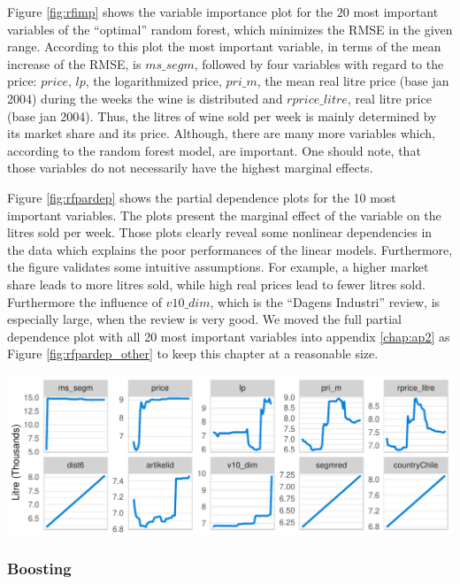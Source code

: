 \documentclass[11pt,]{article}
\let\origfigure\figure
\let\endorigfigure\endfigure
\renewenvironment{figure}[1][2] {
    \expandafter\origfigure\expandafter[H]
} {
    \endorigfigure
}
\begin{document}
Figure \ref{fig:rfimp} shows the variable importance plot for the \(20\)
most important variables of the \enquote{optimal} random forest, which
minimizes the \ac{RMSE} in the given range. According to this plot the
most important variable, in terms of the mean increase of the \ac{RMSE},
is \(ms\_segm\), followed by four variables with regard to the price:
\(price\), \(lp\), the logarithmized price, \(pri\_m\), the mean real
litre price (base jan 2004) during the weeks the wine is distributed and
\(rprice\_litre\), real litre price (base jan 2004). Thus, the litres of
wine sold per week is mainly determined by its market share and its
price. Although, there are many more variables which, according to the
random forest model, are important. One should note, that those
variables do not necessarily have the highest marginal effects.

Figure \ref{fig:rfpardep} shows the partial dependence plots for the 10
most important variables. The plots present the marginal effect of the
variable on the litres sold per week. Those plots clearly reveal some
nonlinear dependencies in the data which explains the poor performances
of the linear models. Furthermore, the figure validates some intuitive
assumptions. For example, a higher market share leads to more litres
sold, while high real prices lead to fewer litres sold. Furthermore the
influence of \(v10\_dim\), which is the \enquote{Dagens Industri}
review, is especially large, when the review is very good. We moved the
full partial dependence plot with all 20 most important variables into
appendix \ref{chap:ap2} as Figure \ref{fig:rfpardep_other} to keep this
chapter at a reasonable size.

\begin{figure}
\centering
\includegraphics{../00_data/output_paper/11_par_dep_random_forest.pdf}
\caption{\label{fig:rfpardep}Random Forest: Partial Dependence Plots.}
\end{figure}

\hypertarget{boosting}{%
\subsubsection{Boosting}\label{boosting}}
\end{document}
